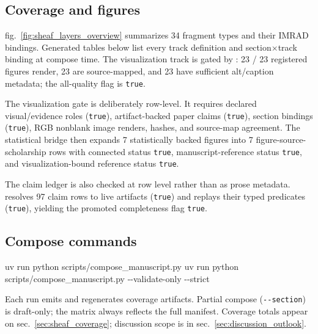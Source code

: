 \documentclass[
  english,
]{article}
\newenvironment{Shaded}{}{}
\newcommand{\AttributeTok}[1]{\textcolor[rgb]{0.49,0.56,0.16}{#1}}
\newcommand{\ExtensionTok}[1]{#1}
\newcommand{\NormalTok}[1]{#1}
\begin{document}
\subsection{Coverage and figures}\label{coverage-and-figures}

fig.~\ref{fig:sheaf_layers_overview} summarizes 34 fragment types and
their IMRAD bindings. Generated tables below list every track definition
and section\texorpdfstring{\ensuremath{\times}}{x}track binding at compose time. The visualization track is
gated by : 23
/ 23 registered figures render, 23 are source-mapped, and 23 have
sufficient alt/caption metadata; the all-quality flag is \texttt{true}.

The visualization gate is deliberately row-level. It requires declared
visual/evidence roles (\texttt{true}), artifact-backed paper claims
(\texttt{true}), section bindings (\texttt{true}), RGB nonblank image
renders, hashes, and source-map agreement. The statistical bridge then
expands 7 statistically backed figures into 7 figure-source-scholarship
rows with connected status \texttt{true}, manuscript-reference status
\texttt{true}, and visualization-bound reference status \texttt{true}.

The claim ledger is also checked at row level rather than as prose
metadata.  resolves 97 claim rows to
live artifacts (\texttt{true}) and replays their typed predicates
(\texttt{true}), yielding the promoted completeness flag \texttt{true}.

\subsection{Compose commands}\label{compose-commands}

\begin{Shaded}
\begin{Highlighting}[]
\ExtensionTok{uv}\NormalTok{ run python scripts/compose\_manuscript.py}
\ExtensionTok{uv}\NormalTok{ run python scripts/compose\_manuscript.py }\AttributeTok{{-}{-}validate{-}only} \AttributeTok{{-}{-}strict}
\end{Highlighting}
\end{Shaded}

Each run emits  and
regenerates coverage artifacts. Partial compose (\texttt{-\/-section})
is draft-only; the matrix always reflects the full manifest. Coverage
totals appear on sec.~\ref{sec:sheaf_coverage}; discussion scope is in
sec.~\ref{sec:discussion_outlook}.
\end{document}
